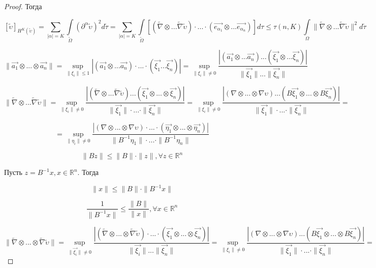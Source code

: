 \documentclass[__main__.tex]{subfiles}
\begin{document}
\begin{proof}
Тогда 

$$
\left[\tilde{\upsilon}\right]_{H^K\left(\tilde{\upsilon}\right)} = \sum_{\left|\alpha\right| = K} \int\limits_{\tilde{\Omega}} \left(\partial^\alpha \tilde{\upsilon}\right)^2 d\tilde{\tau} = \sum_{\left|\alpha\right| = K} \int\limits_{\tilde{\Omega}} \left[\left(\tilde{\nabla} \otimes ... \tilde{\nabla} \tilde{\upsilon}\right) \cdot ... \cdot \left(\vec{e_{\alpha_1}} \otimes ... \vec{e_{\alpha_n}}\right)\right] d\tau \leq \tau \left(n,K\right) \int\limits_{\Omega} \|\tilde{\nabla} \otimes ... \tilde{\nabla} \tilde{\upsilon}\|^2 d\tilde{\tau}
$$

$$
\|\vec{a_1} \otimes ... \otimes \vec{a_n}\| = \sup_{\|\xi_i\| \leq 1} \left|\left(\vec{a_1} \otimes ... \vec{a_n}\right) \cdot ... \cdot \left(\vec{\xi_1} ... \vec{\xi_n}\right)\right| = \sup_{\|\xi_i\| \neq 0} \frac{\left|\left(\vec{a_1} \otimes ... \vec{a_n}\right) ... \left(\vec{\xi_1} \otimes ... \vec{\xi_n}\right)\right|}{\|\vec{\xi_1}\| ... \|\vec{\xi_n}\|}
$$

$$
\|\tilde{\nabla} \otimes ... \tilde{\nabla} \tilde{\upsilon}\| = \sup_{\|\xi_i\| \neq 0} \frac{\left|\left(\tilde{\nabla} \otimes ... \tilde{\nabla} \tilde{\upsilon}\right) ... \left(\vec{\xi_1} \otimes ... \otimes \vec{\xi_n}\right)\right|}{\|\vec{\xi_1}\| \cdot ... \cdot \|\vec{\xi_n}\|} = \sup_{\|\xi_i\| \neq 0} \frac{\left|\left(\nabla \otimes ... \otimes \nabla \upsilon\right) ... \left(B\vec{\xi_1} \otimes ... \otimes B \vec{\xi_n}\right)\right|}{\|\vec{\xi_1}\| \cdot ... \cdot \|\vec{\xi_n}\|} = 
$$

$$
= \sup_{\|\eta_i\| \neq 0}\frac{\left|\left(\nabla \otimes ... \otimes \nabla \upsilon\right) \cdot ... \cdot \left(\vec{\eta_1} \otimes ... \otimes \vec{\eta_n}\right)\right|}{\|B^{-1}\eta_1\| \cdot ... \cdot \|B^{-1} \eta_n \|}
$$

$$
\|Bz\| \leq \|B\| \cdot \|z\|, \forall z \in \mathbb{R}^n
$$

Пусть $z = B^{-1} x, x\in \mathbb{R}^n$. Тогда

$$
\|x\| \leq \|B\| \cdot \|B^{-1} x\|
$$

$$
\frac{1}{\|B^{-1} x\|} \leq \frac{\|B\|}{\|x\|}, \forall x \in \mathbb{R}^n
$$

$$
\|\tilde{\nabla} \otimes ... \otimes \tilde{\nabla} \tilde{\upsilon} \| = \sup_{\|\vec{\xi_i}\| \neq 0} \frac{\left|\left(\tilde{\nabla} \otimes ... \otimes \tilde{\nabla} \tilde{\upsilon} \right) \cdot ... \cdot\left(\vec{\xi_1} \otimes ... \otimes \vec{\xi_n}\right)\right|}{\|\vec{\xi_i}\| ... \|\vec{\xi_n}\|} = \sup_{\|\xi_i\| \neq 0} \frac{\left|\left(\nabla \otimes ... \otimes \nabla \upsilon\right) ... \left(B\vec{\xi_1} \otimes ... \otimes B \vec{\xi_n}\right)\right|}{\|\vec{\xi_1}\| \cdot ... \cdot \|\vec{\xi_n}\|} = 
$$


\end{proof}
\end{document}
